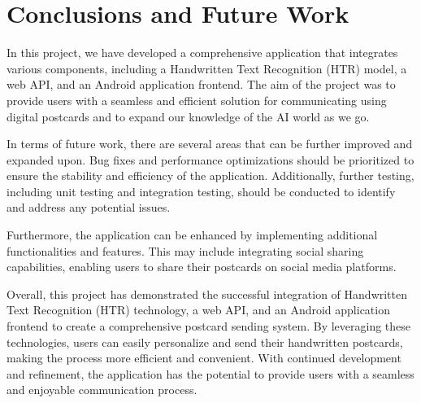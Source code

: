 \chapter{Conclusions and Future Work} 
\label{ch:Chapter8}
\vfill \minitoc \newpage

In this project, we have developed a comprehensive application that integrates various components, including a Handwritten Text Recognition (HTR) model, a web API, and an Android application frontend. The aim of the project was to provide users with a seamless and efficient solution for communicating using digital postcards and to expand our knowledge of the AI world as we go.

In terms of future work, there are several areas that can be further improved and expanded upon. Bug fixes and performance optimizations should be prioritized to ensure the stability and efficiency of the application. Additionally, further testing, including unit testing and integration testing, should be conducted to identify and address any potential issues.

Furthermore, the application can be enhanced by implementing additional functionalities and features. This may include integrating social sharing capabilities, enabling users to share their postcards on social media platforms.

Overall, this project has demonstrated the successful integration of Handwritten Text Recognition (HTR) technology, a web API, and an Android application frontend to create a comprehensive postcard sending system. By leveraging these technologies, users can easily personalize and send their handwritten postcards, making the process more efficient and convenient. With continued development and refinement, the application has the potential to provide users with a seamless and enjoyable communication process.